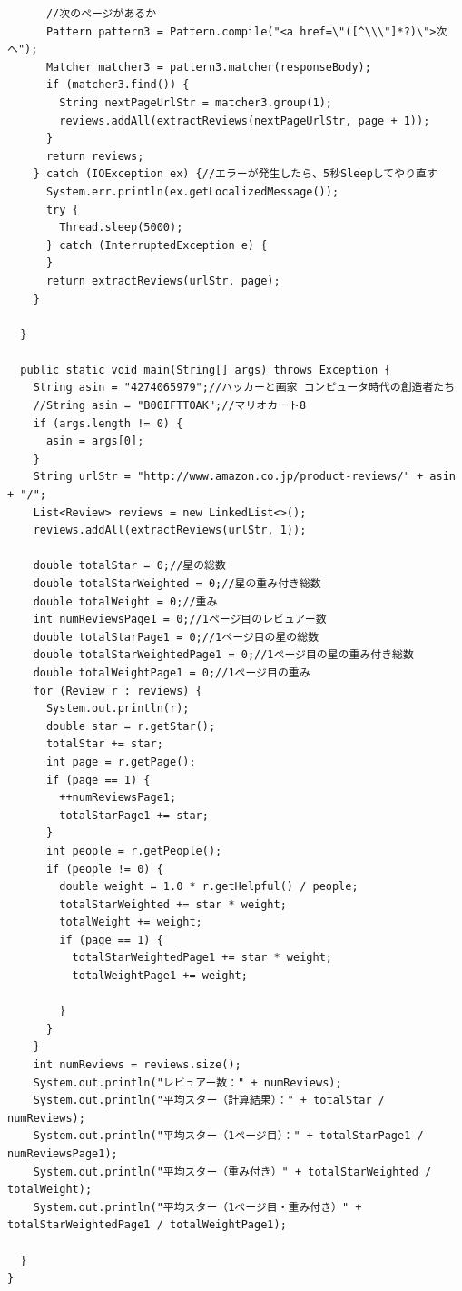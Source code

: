 \begin{lstlisting}
      //次のページがあるか
      Pattern pattern3 = Pattern.compile("<a href=\"([^\\\"]*?)\">次へ");
      Matcher matcher3 = pattern3.matcher(responseBody);
      if (matcher3.find()) {
        String nextPageUrlStr = matcher3.group(1);
        reviews.addAll(extractReviews(nextPageUrlStr, page + 1));
      }
      return reviews;
    } catch (IOException ex) {//エラーが発生したら、5秒Sleepしてやり直す
      System.err.println(ex.getLocalizedMessage());
      try {
        Thread.sleep(5000);
      } catch (InterruptedException e) {
      }
      return extractReviews(urlStr, page);
    }

  }

  public static void main(String[] args) throws Exception {
    String asin = "4274065979";//ハッカーと画家 コンピュータ時代の創造者たち
    //String asin = "B00IFTTOAK";//マリオカート8
    if (args.length != 0) {
      asin = args[0];
    }
    String urlStr = "http://www.amazon.co.jp/product-reviews/" + asin + "/";
    List<Review> reviews = new LinkedList<>();
    reviews.addAll(extractReviews(urlStr, 1));

    double totalStar = 0;//星の総数
    double totalStarWeighted = 0;//星の重み付き総数
    double totalWeight = 0;//重み
    int numReviewsPage1 = 0;//1ページ目のレビュアー数
    double totalStarPage1 = 0;//1ページ目の星の総数
    double totalStarWeightedPage1 = 0;//1ページ目の星の重み付き総数
    double totalWeightPage1 = 0;//1ページ目の重み
    for (Review r : reviews) {
      System.out.println(r);
      double star = r.getStar();
      totalStar += star;
      int page = r.getPage();
      if (page == 1) {
        ++numReviewsPage1;
        totalStarPage1 += star;
      }
      int people = r.getPeople();
      if (people != 0) {
        double weight = 1.0 * r.getHelpful() / people;
        totalStarWeighted += star * weight;
        totalWeight += weight;
        if (page == 1) {
          totalStarWeightedPage1 += star * weight;
          totalWeightPage1 += weight;

        }
      }
    }
    int numReviews = reviews.size();
    System.out.println("レビュアー数：" + numReviews);
    System.out.println("平均スター（計算結果）：" + totalStar / numReviews);
    System.out.println("平均スター（1ページ目）：" + totalStarPage1 / numReviewsPage1);
    System.out.println("平均スター（重み付き）" + totalStarWeighted / totalWeight);
    System.out.println("平均スター（1ページ目・重み付き）" + totalStarWeightedPage1 / totalWeightPage1);

  }
}


\end{lstlisting}


